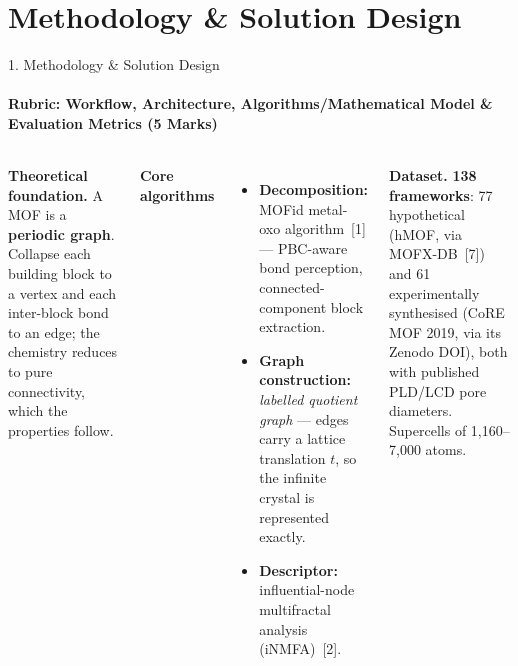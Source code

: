 \documentclass[aspectratio=169, 11pt]{beamer}
\begin{document}
\section{Methodology \& Solution Design}
\begin{frame}{1. Methodology \& Solution Design}
\framesubtitle{Rubric: Workflow, Architecture, Algorithms/Mathematical Model \& Evaluation Metrics (5 Marks)}
\begin{columns}[T]
{\scriptsize
\textbf{Theoretical foundation.} A MOF is a \textbf{periodic graph}. Collapse each building
block to a vertex and each inter-block bond to an edge; the chemistry reduces to pure
connectivity, which the properties follow.

\vspace{0.12cm}
\textbf{Core algorithms}
\begin{itemize}\scriptsize
  \item \textbf{Decomposition:} MOFid metal-oxo algorithm~[1] --- PBC-aware bond
        perception, connected-component block extraction.
  \item \textbf{Graph construction:} \textit{labelled quotient graph} --- edges carry a
        lattice translation $t$, so the infinite crystal is represented exactly.
  \item \textbf{Descriptor:} influential-node multifractal analysis (iNMFA)~[2].
\end{itemize}

\vspace{0.12cm}
\textbf{Dataset.} \textbf{138 frameworks}: 77 hypothetical (hMOF, via MOFX-DB~[7]) and 61
experimentally synthesised (CoRE MOF 2019, via its Zenodo DOI), both with published PLD/LCD
pore diameters. Supercells of 1{,}160--7{,}000 atoms.
}


\end{columns}
\end{frame}
\end{document}
